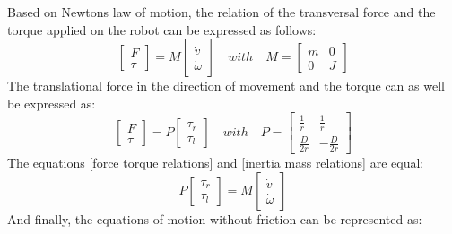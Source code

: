 \documentclass[a4paper, 11pt]{article}
\begin{document}
Based on Newtons law of motion, the relation of the transversal force and the torque applied on the robot can be expressed as follows:
\begin{equation}
\label{inertia mass relations}
	\begin{bmatrix}
	F\\
	\tau
	\end{bmatrix}
	= M
	\begin{bmatrix}
	\dot{v}\\
	\dot{\omega}
	\end{bmatrix}
	\quad with \quad
	M = 
	\begin{bmatrix}
	m &0\\
	0 &J
	\end{bmatrix}
\end{equation}
The translational force in the direction of movement and the torque can as well be expressed as:
\begin{equation}
\label{force torque relations}
	\begin{bmatrix}
	F\\
	\tau
	\end{bmatrix}
	= P
	\begin{bmatrix}
	\tau_r\\
	\tau_l
	\end{bmatrix}
	\quad with \quad
	P = 
	\begin{bmatrix}
	\frac{1}{r} &\frac{1}{r}\\[4pt] 
	\frac{D}{2r} &-\frac{D}{2r}
	\end{bmatrix}
\end{equation}
The equations \eqref{force torque relations} and \eqref{inertia mass relations} are equal:
\begin{equation}
P
\begin{bmatrix}
\tau_r\\
\tau_l
\end{bmatrix}
= M
\begin{bmatrix}
\dot{v}\\
\dot{\omega}
\end{bmatrix}
\end{equation}
And finally, the equations of motion without friction can be represented as:
\end{document}
